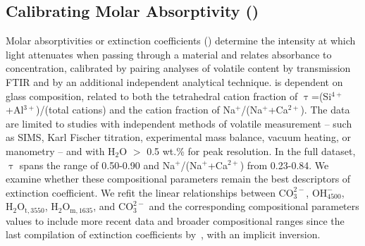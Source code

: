 \documentclass[draft]{agujournal2019}
\begin{document}
\subsection{Calibrating Molar Absorptivity (\textepsilon)}
Molar absorptivities or extinction coefficients (\textepsilon) determine the intensity at which light attenuates when passing through a material and relates absorbance to concentration, calibrated by pairing analyses of volatile content by transmission FTIR and by an additional independent analytical technique. \textepsilon is dependent on glass composition, related to both the tetrahedral cation fraction of $\uptau$=(Si$^{4+}$+Al$^{3+}$)/(total cations) and the cation fraction of Na$^{+}$/(Na$^{+}$+Ca$^{2+}$). The \textepsilon data are limited to studies with independent methods of volatile measurement – such as SIMS, Karl Fischer titration, experimental mass balance, vacuum heating, or manometry – and with H$_{2}$O $>$ 0.5 wt.\% for peak resolution. In the full dataset, $\uptau$ spans the range of 0.50-0.90 and Na$^{+}$/(Na$^{+}$+Ca$^{2+}$) from 0.23-0.84. We examine whether these compositional parameters remain the best descriptors of extinction coefficient. We refit the linear relationships between \textepsilon${\mathrm{CO_3^{2-}}}$, \textepsilon${\mathrm{OH^{-}_{4500}}}$, \textepsilon${\mathrm{H_2O_{t, 3550}}}$, \textepsilon${\mathrm{H_2O_{m, 1635}}}$, and \textepsilon${\mathrm{CO_3^{2-}}}$ and the corresponding compositional parameters values to include more recent data and broader compositional ranges since the last compilation of extinction coefficients by~, with an implicit inversion. 
\end{document}
